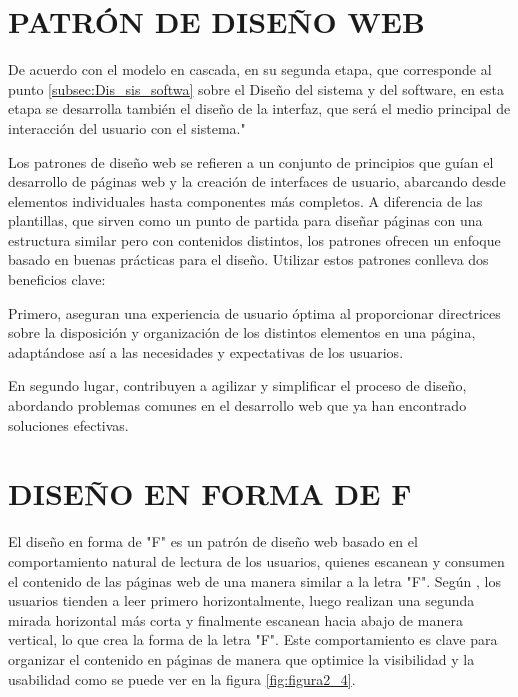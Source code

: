 	\section{PATRÓN DE DISEÑO WEB}
		De acuerdo con el modelo en cascada, en su segunda etapa, que corresponde al punto \ref{subsec:Dis_sis_softwa} sobre el Diseño del sistema y del software, en esta etapa se desarrolla también el diseño de la interfaz, que será el medio principal de interacción del usuario con el sistema."
		
		Los patrones de diseño web se refieren a un conjunto de principios que guían el desarrollo de páginas web y la creación de interfaces de usuario, abarcando desde elementos individuales hasta componentes más completos. A diferencia de las plantillas, que sirven como un punto de partida para diseñar páginas con una estructura similar pero con contenidos distintos, los patrones ofrecen un enfoque basado en buenas prácticas para el diseño. Utilizar estos patrones conlleva dos beneficios clave:
		
		Primero, aseguran una experiencia de usuario óptima al proporcionar directrices sobre la disposición y organización de los distintos elementos en una página, adaptándose así a las necesidades y expectativas de los usuarios.
		
		En segundo lugar, contribuyen a agilizar y simplificar el proceso de diseño, abordando problemas comunes en el desarrollo web que ya han encontrado soluciones efectivas.
		
	\section{DISEÑO EN FORMA DE F}
		
		El diseño en forma de "F" es un patrón de diseño web basado en el comportamiento natural de lectura de los usuarios, quienes escanean y consumen el contenido de las páginas web de una manera similar a la letra "F". Según \textcite{nielsen2006fshaped}, los usuarios tienden a leer primero horizontalmente, luego realizan una segunda mirada horizontal más corta y finalmente escanean hacia abajo de manera vertical, lo que crea la forma de la letra "F". Este comportamiento es clave para organizar el contenido en páginas de manera que optimice la visibilidad y la usabilidad como se puede ver en la figura \ref{fig:figura2_4}.
		
		\vspace{0.3cm} %
		

